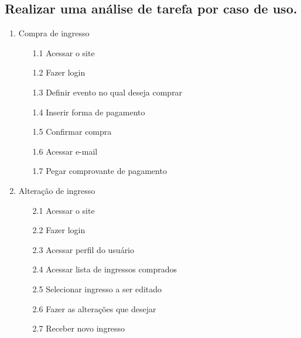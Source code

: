 \documentclass[12pt]{article}
\begin{document}
        \subsection{Realizar uma análise de tarefa por caso de uso.}
            \begin{enumerate}
                \item Compra de ingresso
                    \begin{enumerate}
                        \item[1.1] Acessar o site 
                        \item[1.2] Fazer login
                        \item[1.3] Definir evento no qual deseja comprar 
                        \item[1.4] Inserir forma de pagamento
                        \item[1.5] Confirmar compra
                        \item[1.6] Acessar e-mail
                        \item[1.7] Pegar comprovante de pagamento
                    \end{enumerate}
            
                \item Alteração de ingresso
                    \begin{enumerate}
                        \item[2.1] Acessar o site 
                        \item[2.2] Fazer login
                        \item[2.3] Acessar perfil do usuário
                        \item[2.4] Acessar lista de ingressos comprados
                        \item[2.5] Selecionar ingresso a ser editado
                        \item[2.6] Fazer as alterações que desejar
                        \item[2.7] Receber novo ingresso
                    \end{enumerate}


\end{enumerate}
\end{document}
